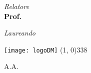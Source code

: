\begin{titlepage}
\begin{center}
\vspace*{8cm}


\begin{large}
\begin{flushleft}
\textit{Relatore}\\ 
\vspace{5pt} 
\textbf{Prof. \mySupervisor}
\end{flushleft}

\vspace*{-2.36cm} 

\begin{flushright}
\textit{Laureando}\\ 
\vspace{5pt} 
\textbf{\myName}
\end{flushright}
\end{large}


\vfill
\texttt{[image: logoDM]}
\line(1, 0){338} \\
\begin{normalsize}
\textsc{A.A. \myAA}
\end{normalsize}

\end{center}
\end{titlepage}
